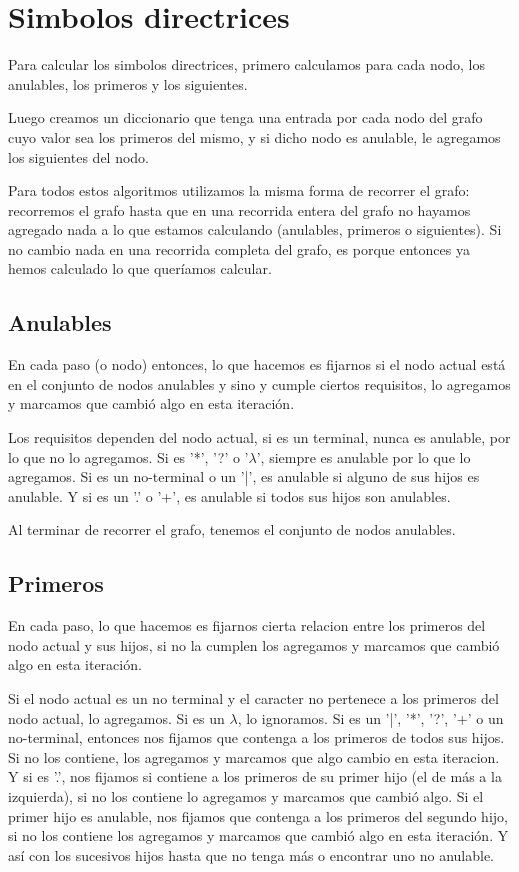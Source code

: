 \documentclass[a4paper]{report}
\begin{document}
\section*{Simbolos directrices}

Para calcular los simbolos directrices, primero calculamos para cada nodo, los
anulables, los primeros y los siguientes.


Luego creamos un diccionario que tenga una entrada por cada nodo del grafo cuyo
valor sea los primeros del mismo, y si dicho nodo es anulable, le agregamos los
siguientes del nodo.


Para todos estos algoritmos utilizamos la misma forma de recorrer el grafo:
recorremos el grafo hasta que en una recorrida entera del grafo no hayamos
agregado nada a lo que estamos calculando (anulables, primeros o siguientes). Si
no cambio nada en una recorrida completa del grafo, es porque entonces ya hemos
calculado lo que queríamos calcular.

\subsection*{Anulables}

	En cada paso (o nodo) entonces, lo que hacemos es fijarnos si el nodo
actual está en el conjunto de nodos anulables y sino y cumple ciertos
requisitos, lo agregamos y marcamos que cambió algo en esta iteración.


	Los requisitos dependen del nodo actual, si es un terminal, nunca es
anulable, por lo que no lo agregamos. Si es '*', '?' o '$\lambda$', siempre es anulable
por lo que lo agregamos. Si es un no-terminal o un '|', es anulable si alguno de
sus hijos es anulable. Y si es un '.' o '+', es anulable si todos sus hijos son
anulables.


	Al terminar de recorrer el grafo, tenemos el conjunto de nodos
anulables.

\subsection*{Primeros}

	En cada paso, lo que hacemos es fijarnos cierta relacion entre los primeros
del nodo actual y sus hijos, si no la cumplen los agregamos y marcamos que
cambió algo en esta iteración.


	Si el nodo actual es un no terminal y el caracter no pertenece a los
primeros del nodo actual, lo agregamos. Si es un $\lambda$, lo ignoramos. Si es un
'|', '*', '?', '+' o un no-terminal, entonces nos fijamos que contenga a los
primeros de todos sus hijos. Si no los contiene, los agregamos y marcamos que
algo cambio en esta iteracion. Y si es '.', nos fijamos si contiene a los
primeros de su primer hijo (el de más a la izquierda), si no los contiene lo
agregamos y marcamos que cambió algo. Si el primer hijo es anulable, nos fijamos
que contenga a los primeros del segundo hijo, si no los contiene los agregamos y
marcamos que cambió algo en esta iteración. Y así con los sucesivos hijos hasta
que no tenga más o encontrar uno no anulable.
\end{document}
